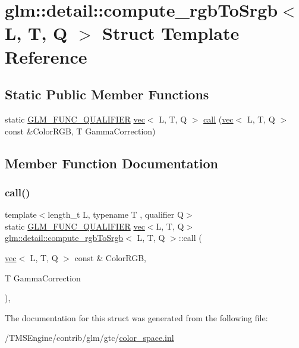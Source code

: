 \hypertarget{structglm_1_1detail_1_1compute__rgb_to_srgb}{}\section{glm\+:\+:detail\+:\+:compute\+\_\+rgb\+To\+Srgb$<$ L, T, Q $>$ Struct Template Reference}
\label{structglm_1_1detail_1_1compute__rgb_to_srgb}
\subsection*{Static Public Member Functions}
\begin{DoxyCompactItemize}
\item 
static \hyperlink{setup_8hpp_a33fdea6f91c5f834105f7415e2a64407}{G\+L\+M\+\_\+\+F\+U\+N\+C\+\_\+\+Q\+U\+A\+L\+I\+F\+I\+ER} \hyperlink{structglm_1_1vec}{vec}$<$ L, T, Q $>$ \hyperlink{structglm_1_1detail_1_1compute__rgb_to_srgb_a80f1b6c28ca418cc3eaf661e6714d7b5}{call} (\hyperlink{structglm_1_1vec}{vec}$<$ L, T, Q $>$ const \&Color\+R\+GB, T Gamma\+Correction)
\end{DoxyCompactItemize}


\subsection{Member Function Documentation}
\mbox{\label{structglm_1_1detail_1_1compute__rgb_to_srgb_a80f1b6c28ca418cc3eaf661e6714d7b5}} 
\subsubsection{\texorpdfstring{call()}{call()}}
{\footnotesize\ttfamily template$<$length\+\_\+t L, typename T , qualifier Q$>$ \\
static \hyperlink{setup_8hpp_a33fdea6f91c5f834105f7415e2a64407}{G\+L\+M\+\_\+\+F\+U\+N\+C\+\_\+\+Q\+U\+A\+L\+I\+F\+I\+ER} \hyperlink{structglm_1_1vec}{vec}$<$L, T, Q$>$ \hyperlink{structglm_1_1detail_1_1compute__rgb_to_srgb}{glm\+::detail\+::compute\+\_\+rgb\+To\+Srgb}$<$ L, T, Q $>$\+::call (\begin{DoxyParamCaption}\item[{\hyperlink{structglm_1_1vec}{vec}$<$ L, T, Q $>$ const \&}]{Color\+R\+GB,  }\item[{T}]{Gamma\+Correction }\end{DoxyParamCaption})\hspace{0.3cm}{\ttfamily [inline]}, {\ttfamily [static]}}



The documentation for this struct was generated from the following file\+:\begin{DoxyCompactItemize}
\item 
/\+T\+M\+S\+Engine/contrib/glm/gtc/\hyperlink{gtc_2color__space_8inl}{color\+\_\+space.\+inl}\end{DoxyCompactItemize}
